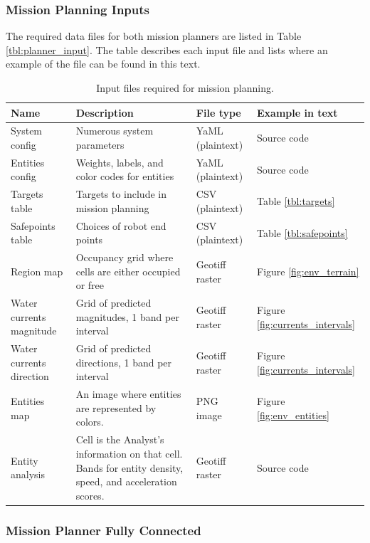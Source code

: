 \documentclass{tamuccthesis}
\begin{document}
\subsubsection{Mission Planning Inputs}

The required data files for both mission planners are listed in Table \ref{tbl:planner_input}. The table describes each input file and lists where an example of the file can be found in this text. 

\begin{table}[H]\small
\begin{tabular}{|p{2.75cm}|p{5cm}|l|l|}
\hline
Name & Description & File type & Example in text \\
\hline
System config    & Numerous system parameters  & YaML (plaintext) & Source code \\
\hline
Entities config  & Weights, labels, and color codes for entities  & YaML (plaintext) & Source code  \\
\hline
Targets table    & Targets to include in mission planning & CSV (plaintext)  & Table \ref{tbl:targets} \\
\hline
Safepoints table & Choices of robot end points & CSV (plaintext)  & Table \ref{tbl:safepoints} \\
\hline
Region map       & Occupancy grid where cells are either occupied or free  & Geotiff raster & Figure \ref{fig:env_terrain} \\
\hline
Water currents magnitude & Grid of predicted magnitudes, 1 band per interval  & Geotiff raster & Figure \ref{fig:currents_intervals} \\
\hline
Water currents direction & Grid of predicted directions, 1 band per interval & Geotiff raster & Figure \ref{fig:currents_intervals} \\
\hline
Entities map & An image where entities are represented by colors. & PNG image & Figure \ref{fig:env_entities} \\
\hline
Entity analysis  & Cell is the Analyst's information on that cell. Bands for entity density, speed, and acceleration scores. & Geotiff raster  & Source code  \\ 
\hline
\end{tabular}
\caption[Mission planning input.]{Input files required for mission planning.}
\end{table}


\subsubsection{Mission Planner Fully Connected}
\end{document}
